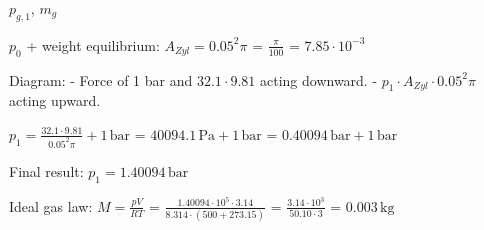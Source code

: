 \( p_{g,1} \), \( m_g \)  

\( p_0 \) + weight equilibrium:  
\( A_{Zyl} = 0.05^2 \pi \)  
= \( \frac{\pi}{100} \)  
= \( 7.85 \cdot 10^{-3} \)  

Diagram:  
- Force of 1 bar and \( 32.1 \cdot 9.81 \) acting downward.  
- \( p_1 \cdot A_{Zyl} \cdot 0.05^2 \pi \) acting upward.  

\( p_1 = \frac{32.1 \cdot 9.81}{0.05^2 \pi} + 1 \, \text{bar} \)  
= \( 40094.1 \, \text{Pa} + 1 \, \text{bar} \)  
= \( 0.40094 \, \text{bar} + 1 \, \text{bar} \)  

Final result:  
\( p_1 = 1.40094 \, \text{bar} \)  

Ideal gas law:  
\( M = \frac{p V}{R T} \)  
= \( \frac{1.40094 \cdot 10^5 \cdot 3.14}{8.314 \cdot (500 + 273.15)} \)  
= \( \frac{3.14 \cdot 10^3}{50.10 \cdot 3} \)  
= \( 0.003 \, \text{kg} \)